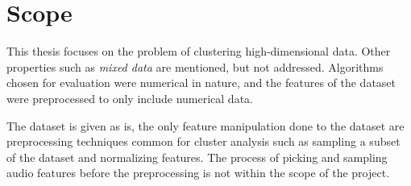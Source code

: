\documentclass[../report.tex]{subfiles}
\begin{document}
\section{Scope}
This thesis focuses on the problem of clustering high-dimensional data. Other properties such as \textit{mixed data} are mentioned, but not addressed. Algorithms chosen for evaluation were numerical in nature, and the features of the dataset were preprocessed to only include numerical data.

The dataset is given as is, the only feature manipulation done to the dataset are preprocessing techniques common for cluster analysis such as sampling a subset of the dataset and normalizing features. The process of picking and sampling audio features before the preprocessing is not within the scope of the project.


\end{document}
